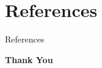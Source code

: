 \documentclass[aspectratio=169, 10pt]{beamer}
\begin{document}
\section{References}
\begin{frame}[allowframebreaks]{References}
\small
\end{frame}

\begin{frame}
\centering
{\Huge \textbf{\textcolor{amritaMaroon}{Thank You}}}\\
\vspace{0.3cm}{\large Questions \& Discussion}
\end{frame}
\end{document}
